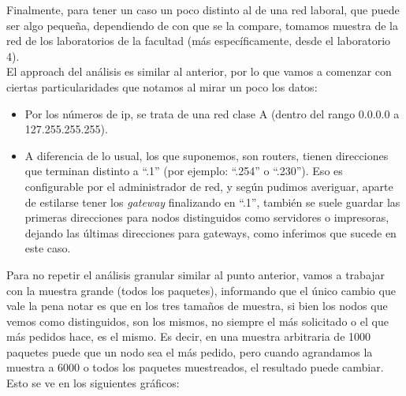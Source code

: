\indent Finalmente, para tener un caso un poco distinto al de una red laboral, que puede ser algo pequeña, dependiendo de con que se la compare, tomamos muestra de la red de los laboratorios de la facultad (más específicamente, desde el laboratorio 4).\\
\indent El approach del análisis es similar al anterior, por lo que vamos a comenzar con ciertas particularidades que notamos al mirar un poco los datos:
\begin{itemize}
	\item Por los números de ip, se trata de una red clase A (dentro del rango 0.0.0.0 a 127.255.255.255).
	\item A diferencia de lo usual, los que suponemos, son routers, tienen direcciones que terminan distinto a ``.1'' (por ejemplo: ``.254'' o ``.230''). Eso es configurable por el administrador de red, y según pudimos averiguar, aparte de estilarse tener los \textit{gateway} finalizando en ``.1'', también se suele guardar las primeras direcciones para nodos distinguidos como servidores o impresoras, dejando las últimas direcciones para gateways, como inferimos que sucede en este caso.
\end{itemize}
\indent Para no repetir el análisis granular similar al punto anterior, vamos a trabajar con la muestra grande (todos los paquetes), informando que el único cambio que vale la pena notar es que en los tres tamaños de muestra, si bien los nodos que vemos como distinguidos, son los mismos, no siempre el más solicitado o el que más pedidos hace, es el mismo. Es decir, en una muestra arbitraria de 1000 paquetes puede que un nodo sea el más pedido, pero cuando agrandamos la muestra a 6000 o todos los paquetes muestreados, el resultado puede cambiar. Esto se ve en los siguientes gráficos:

